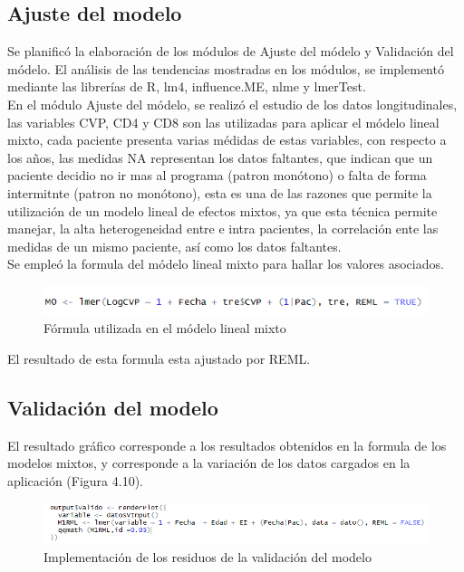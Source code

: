 \subsection{Ajuste del modelo}

Se planific\'o la elaboraci\'on de los m\'odulos de Ajuste del m\'odelo y Validaci\'on del m\'odelo. El an\'alisis de las tendencias mostradas en los m\'odulos, se implement\'o mediante las librer\'ias de R, lm4, influence.ME, nlme y lmerTest.\\

En el m\'odulo Ajuste del m\'odelo, se realiz\'o el estudio de los datos longitudinales, las variables CVP, CD4 y CD8 son las utilizadas para aplicar el m\'odelo lineal mixto, cada paciente presenta varias m\'edidas de estas variables, con respecto a los años, las medidas  NA representan los datos faltantes, que indican que un  paciente decidio no ir mas al programa (patron mon\'otono)  o falta de forma intermitnte (patron no mon\'otono), esta es una de las razones que permite la utilizaci\'on de un modelo lineal de efectos mixtos, ya que esta t\'ecnica permite manejar, la alta heterogeneidad entre e intra pacientes, la correlaci\'on ente las medidas de un mismo paciente, as\'i como los datos faltantes.\\

Se emple\'o la formula del m\'odelo lineal mixto para hallar los valores asociados.

\begin{figure}[H]
\centering
\includegraphics[scale=1]{formula.png}
\caption{F\'ormula utilizada en el m\'odelo lineal mixto}
\end{figure}

El resultado de esta formula esta ajustado por REML.\\

\subsection{Validaci\'on del modelo}

El resultado gr\'afico corresponde a los resultados obtenidos en la formula de los modelos mixtos, y corresponde a la variaci\'on de los datos cargados en la aplicaci\'on (Figura 4.10).

\begin{figure}[H]
\centering
\includegraphics[scale=0.8]{validacion.PNG}
\caption{Implementaci\'on de los residuos de la validaci\'on del modelo}
\end{figure}
 
